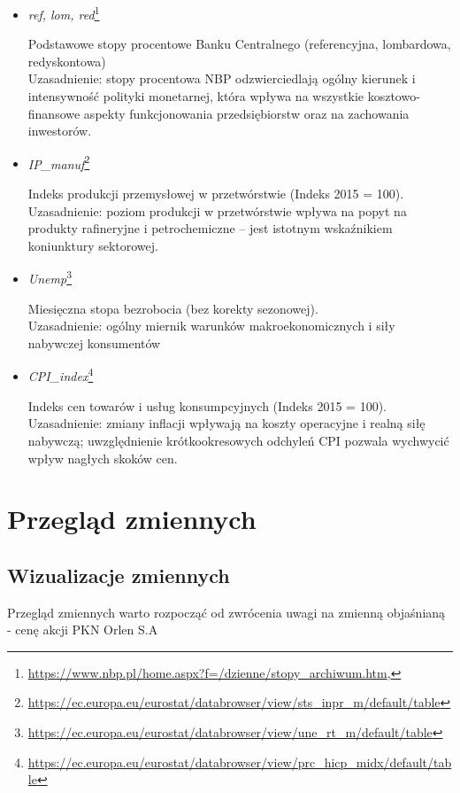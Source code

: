 \documentclass[12pt, twoside]{article}
\begin{document}
\begin{itemize}
  \item \textit{ref, lom, red}\footnote{\url{https://www.nbp.pl/home.aspx?f=/dzienne/stopy_archiwum.htm}, }  

     Podstawowe stopy procentowe Banku Centralnego (referencyjna, lombardowa, redyskontowa)
     \\
     Uzasadnienie: stopy procentowa NBP odzwierciedlają ogólny kierunek i intensywność polityki monetarnej, która wpływa na wszystkie kosztowo-finansowe aspekty funkcjonowania przedsiębiorstw oraz na zachowania inwestorów.  
  
  \item \textit{IP\_manuf}\footnote{\url{https://ec.europa.eu/eurostat/databrowser/view/sts_inpr_m/default/table}}  

     Indeks produkcji przemysłowej w przetwórstwie (Indeks 2015 = 100).  
     \\
     Uzasadnienie: poziom produkcji w przetwórstwie wpływa na popyt na produkty rafineryjne i petrochemiczne – jest istotnym wskaźnikiem koniunktury sektorowej.  

  \newpage
  \item \textit{Unemp}\footnote{\url{https://ec.europa.eu/eurostat/databrowser/view/une_rt_m/default/table}}  

     Miesięczna stopa bezrobocia (bez korekty sezonowej).  
     \\
     Uzasadnienie: ogólny miernik warunków makroekonomicznych i siły nabywczej konsumentów  

  \item \textit{CPI\_index}\footnote{\url{https://ec.europa.eu/eurostat/databrowser/view/prc_hicp_midx/default/table}}  

     Indeks cen towarów i usług konsumpcyjnych (Indeks 2015 = 100).  
     \\
     Uzasadnienie: zmiany inflacji wpływają na koszty operacyjne i realną siłę nabywczą; uwzględnienie krótkookresowych odchyleń CPI pozwala wychwycić wpływ nagłych skoków cen.  
\end{itemize}

\section{Przegląd zmiennych}
\subsection*{Wizualizacje zmiennych}

\noindent
Przegląd zmiennych warto rozpocząć od zwrócenia uwagi na zmienną objaśnianą - cenę akcji PKN Orlen S.A
\end{document}
